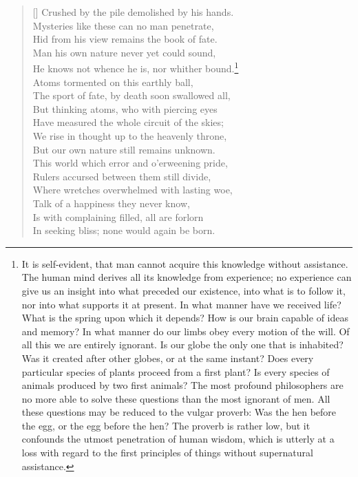 \begin{verse}[\versewidth]
Crushed by the pile demolished by his hands.\\
Mysteries like these can no man penetrate,\\
Hid from his view remains the book of fate.\\
Man his own nature never yet could sound,\\
He knows not whence he is, nor whither bound.\footnote{It is
self-evident, that man cannot acquire this knowledge without
assistance. The human mind derives all its knowledge from experience;
no experience can give us an insight into what preceded our existence,
into what is to follow it, nor into what supports it at present. In
what manner have we received life? What is the spring upon which it
depends? How is our brain capable of ideas and memory? In what manner
do our limbs obey every motion of the will. Of all this we are
entirely ignorant. Is our globe the only one that is inhabited? Was it
created after other globes, or at the same instant? Does every
particular species of plants proceed from a first plant? Is every
species of animals produced by two first animals? The most profound
philosophers are no more able to solve these questions than the most
ignorant of men. All these questions may be reduced to the vulgar
proverb: Was the hen before the egg, or the egg before the hen? The
proverb is rather low, but it confounds the utmost penetration of
human wisdom, which is utterly at a loss with regard to the first
principles of things without supernatural assistance.}\\
Atoms tormented on this earthly ball,\\
The sport of fate, by death soon swallowed all,\\
But thinking atoms, who with piercing eyes\\
Have measured the whole circuit of the skies;\\
We rise in thought up to the heavenly throne,\\
But our own nature still remains unknown.\\
This world which error and o'erweening pride,\\
Rulers accursed between them still divide,\\
Where wretches overwhelmed with lasting woe,\\
Talk of a happiness they never know,\\
Is with complaining filled, all are forlorn\\
In seeking bliss; none would again be born.\\

\end{verse}
